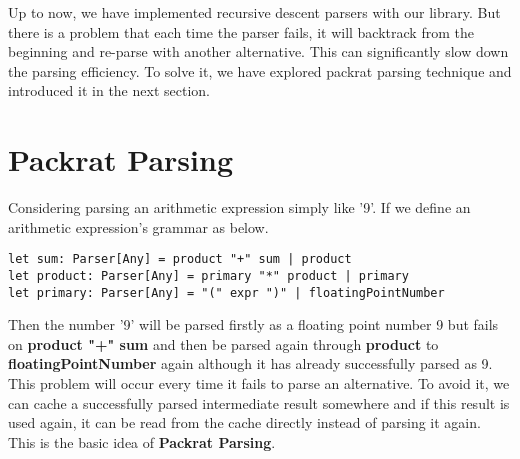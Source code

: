 Up to now, we have implemented recursive descent parsers with our library. But there is a problem that each time the parser fails, it will backtrack from the beginning and re-parse with another alternative. This can significantly slow down the parsing efficiency. To solve it, we have explored packrat parsing technique and introduced it in the next section.

\section{Packrat Parsing}
Considering parsing an arithmetic expression simply like '9'. If we define an arithmetic expression's grammar as below.
\begin{lstlisting}
let sum: Parser[Any] = product "+" sum | product
let product: Parser[Any] = primary "*" product | primary
let primary: Parser[Any] = "(" expr ")" | floatingPointNumber
\end{lstlisting}
Then the number '9' will be parsed firstly as a floating point number 9 but fails on \textbf{product "+" sum} and then be parsed again through \textbf{product} to \textbf{floatingPointNumber} again although it has already successfully parsed as 9. This problem will occur every time it fails to parse an alternative. To avoid it, we can cache a successfully parsed intermediate result somewhere and if this result is used again, it can be read from the cache directly instead of parsing it again. This is the basic idea of \textbf{Packrat Parsing}.

